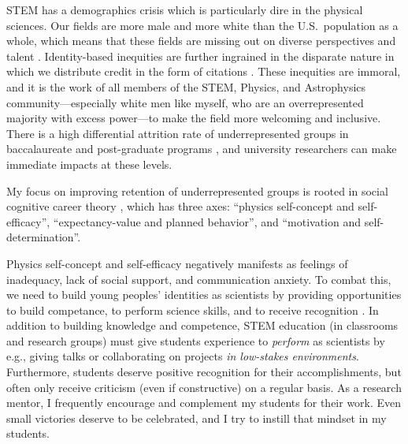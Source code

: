 \documentclass[11pt]{article}
\begin{document}
\thispagestyle{fancy}

\vspace{-0.2cm}
STEM has a demographics crisis which is particularly dire in the physical sciences. 
Our fields are more male and more white than the U.S.~population as a whole, which means that these fields are missing out on diverse perspectives and talent \citep{stem_laborforce_2021}. 
Identity-based inequities are further ingrained in the disparate nature in which we distribute credit in the form of citations \citep{teich_etal_2022}.
These inequities are immoral, and it is the work of all members of the STEM, Physics, and Astrophysics community---especially white men like myself, who are an overrepresented majority with excess power---to make the field more welcoming and inclusive.
There is a high differential attrition rate of underrepresented groups in baccalaureate and post-graduate programs \citep{whitcomb_singh_2021}, and university researchers can make immediate impacts at these levels.

My focus on improving retention of underrepresented groups is rooted in social cognitive career theory \citep{kelly_2016}, which has three axes: ``physics self-concept and self-efficacy'', ``expectancy-value and planned behavior'', and ``motivation and self-determination''.

Physics self-concept and self-efficacy negatively manifests as feelings of inadequacy, lack of social support, and communication anxiety.
To combat this, we need to build young peoples' identities as scientists by providing opportunities to build competance, to perform science skills, and to receive recognition  \citep{hazari_etal_2010}.
In addition to building knowledge and competence, STEM education (in classrooms and research groups) must give students experience to \emph{perform} as scientists by e.g., giving talks or collaborating on projects \emph{in low-stakes environments}.
Furthermore, students deserve positive recognition for their accomplishments, but often only receive criticism (even if constructive) on a regular basis.
As a research mentor, I frequently encourage and complement my students for their work. 
Even small victories deserve to be celebrated, and I try to instill that mindset in my students.
\end{document}
